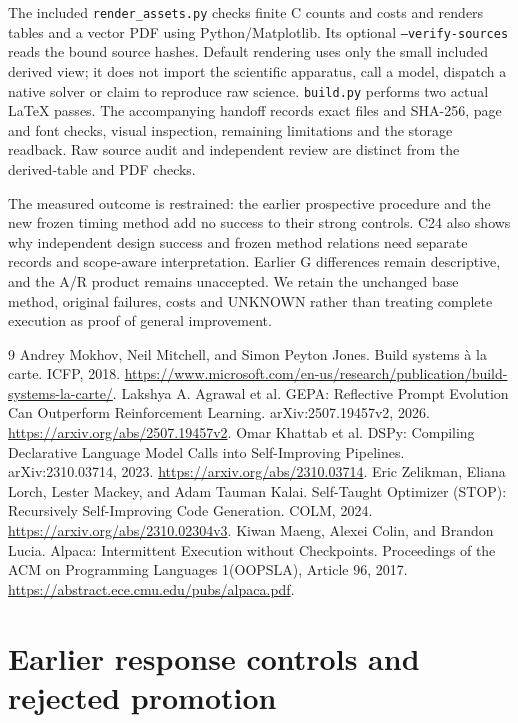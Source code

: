 The included \texttt{render\_assets.py} checks finite C counts and costs and
renders tables and a vector PDF using Python/Matplotlib. Its optional
\texttt{--verify-sources} reads the bound source hashes. Default rendering uses
only the small included derived view; it does not import the scientific
apparatus, call a model, dispatch a native solver or claim to reproduce raw
science. \texttt{build.py} performs two actual LaTeX passes. The accompanying
handoff records exact files and SHA-256, page and font checks, visual inspection,
remaining limitations and the storage readback. Raw source audit and independent
review are distinct from the derived-table and PDF checks.

The measured outcome is restrained: the earlier prospective procedure and the
new frozen timing method add no success to their strong controls. C24 also
shows why independent design success and frozen method relations need separate
records and scope-aware interpretation. Earlier G differences remain descriptive,
and the A/R product remains unaccepted. We retain the unchanged base method,
original failures, costs and UNKNOWN rather than treating complete execution
as proof of general improvement.

\begin{thebibliography}{9}
Andrey Mokhov, Neil Mitchell, and Simon Peyton Jones.
Build systems \`a la carte. ICFP, 2018.
\url{https://www.microsoft.com/en-us/research/publication/build-systems-la-carte/}.
Lakshya A. Agrawal et al.
GEPA: Reflective Prompt Evolution Can Outperform Reinforcement Learning.
arXiv:2507.19457v2, 2026.
\url{https://arxiv.org/abs/2507.19457v2}.
Omar Khattab et al.
DSPy: Compiling Declarative Language Model Calls into Self-Improving Pipelines.
arXiv:2310.03714, 2023.
\url{https://arxiv.org/abs/2310.03714}.
Eric Zelikman, Eliana Lorch, Lester Mackey, and Adam Tauman Kalai.
Self-Taught Optimizer (STOP): Recursively Self-Improving Code Generation.
COLM, 2024. \url{https://arxiv.org/abs/2310.02304v3}.
Kiwan Maeng, Alexei Colin, and Brandon Lucia.
Alpaca: Intermittent Execution without Checkpoints.
Proceedings of the ACM on Programming Languages 1(OOPSLA), Article 96, 2017.\newline
\url{https://abstract.ece.cmu.edu/pubs/alpaca.pdf}.
\end{thebibliography}

\clearpage
\appendix
\section{Earlier response controls and rejected promotion}
\label{sec:early}
